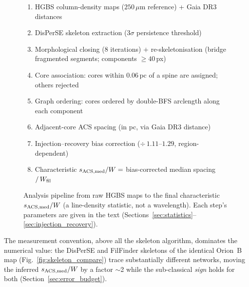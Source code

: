 \documentclass[usenatbib,twoside,twocolumn]{mnras}
\begin{document}
\begin{figure}
\centering
\begin{minipage}{0.95\columnwidth}
\footnotesize
\begin{enumerate}\setlength{\itemsep}{2pt}
\item HGBS column-density maps ($250\,\mu$m reference) + Gaia DR3 distances
\item DisPerSE skeleton extraction ($3\sigma$ persistence threshold)
\item Morphological closing (8 iterations) $+$ re-skeletonisation (bridge fragmented segments; components $\geq40$\,px)
\item Core association: cores within $0.06$\,pc of a spine are assigned; others rejected
\item Graph ordering: cores ordered by double-BFS arclength along each component
\item Adjacent-core ACS spacing (in pc, via Gaia DR3 distance)
\item Injection--recovery bias correction ($\div\,1.11$--$1.29$, region-dependent)
\item Characteristic $s_{\rm ACS,med}/W = $ bias-corrected median spacing $/\,W_{\rm fil}$
\end{enumerate}
\end{minipage}
\caption{Analysis pipeline from raw HGBS maps to the final characteristic $s_{\rm ACS,med}/W$ (a line-density statistic, not a wavelength). Each step's parameters are given in the text (Sections~\ref{sec:statistics}--\ref{sec:injection_recovery}).}
\label{fig:pipeline}
\end{figure}

The measurement convention, above all the skeleton algorithm, dominates the numerical value: the DisPerSE and FilFinder skeletons of the identical Orion~B map (Fig.~\ref{fig:skeleton_compare}) trace substantially different networks, moving the inferred $s_{\rm ACS,med}/W$ by a factor $\sim$2 while the sub-classical \emph{sign} holds for both (Section~\ref{sec:error_budget}).
\end{document}
